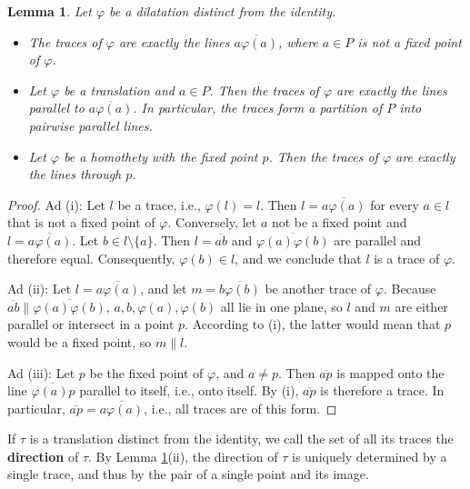 \documentclass[11pt,a4paper]{article}
\newcommand{\lineab}[1]{\overline{#1}}
\newtheorem{lemma}[theorem]{Lemma}
\begin{document}
\begin{lemma} \label{lem:trace_properties}
Let $\varphi$ be a dilatation distinct from the identity.
\begin{itemize}
    \item[(i)] The traces of $\varphi$ are exactly the lines $\lineab{a\varphi(a)}$, where $a \in P$ is not a fixed point of $\varphi$.
    \item[(ii)] Let $\varphi$ be a translation and $a \in P$. Then the traces of $\varphi$ are exactly the lines parallel to $\lineab{a\varphi(a)}$. In particular, the traces form a partition of $P$ into pairwise parallel lines.
    \item[(iii)] Let $\varphi$ be a homothety with the fixed point $p$. Then the traces of $\varphi$ are exactly the lines through $p$.
\end{itemize}
\end{lemma}

\begin{proof}
Ad (i): Let $l$ be a trace, i.e., $\varphi(l) = l$. Then $l = \lineab{a\varphi(a)}$ for every $a \in l$ that is not a fixed point of $\varphi$. Conversely, let $a$ not be a fixed point and $l = \lineab{a\varphi(a)}$. Let $b \in l \setminus \{a\}$. Then $l = \lineab{ab}$ and $\lineab{\varphi(a)\varphi(b)}$ are parallel and therefore equal. Consequently, $\varphi(b) \in l$, and we conclude that $l$ is a trace of $\varphi$.

Ad (ii): Let $l = \lineab{a\varphi(a)}$, and let $m = \lineab{b\varphi(b)}$ be another trace of $\varphi$. Because $\lineab{ab} \parallel \lineab{\varphi(a)\varphi(b)}$, $a, b, \varphi(a), \varphi(b)$ all lie in one plane, so $l$ and $m$ are either parallel or intersect in a point $p$. According to (i), the latter would mean that $p$ would be a fixed point, so $m \parallel l$.

Ad (iii): Let $p$ be the fixed point of $\varphi$, and $a \neq p$. Then $\lineab{ap}$ is mapped onto the line $\lineab{\varphi(a)p}$ parallel to itself, i.e., onto itself. By (i), $\lineab{ap}$ is therefore a trace. In particular, $\lineab{ap} = \lineab{a\varphi(a)}$, i.e., all traces are of this form.
\end{proof}

If $\tau$ is a translation distinct from the identity, we call the set of all its traces the \textbf{direction} of $\tau$. By Lemma \ref{lem:trace_properties}(ii), the direction of $\tau$ is uniquely determined by a single trace, and thus by the pair of a single point and its image.
\end{document}
